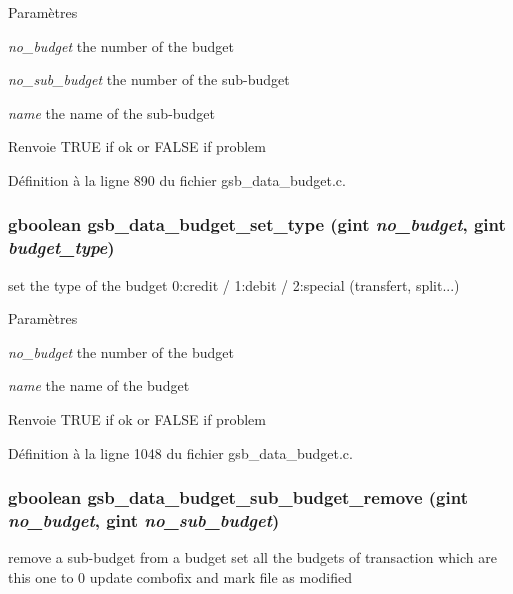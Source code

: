 \begin{DoxyParams}{Paramètres}
\item[{\em no\_\-budget}]the number of the budget \item[{\em no\_\-sub\_\-budget}]the number of the sub-\/budget \item[{\em name}]the name of the sub-\/budget\end{DoxyParams}
\begin{DoxyReturn}{Renvoie}
TRUE if ok or FALSE if problem 
\end{DoxyReturn}


Définition à la ligne 890 du fichier gsb\_\-data\_\-budget.c.

\subsubsection[{gsb\_\-data\_\-budget\_\-set\_\-type}]{\setlength{\rightskip}{0pt plus 5cm}gboolean gsb\_\-data\_\-budget\_\-set\_\-type (gint {\em no\_\-budget}, \/  gint {\em budget\_\-type})}\label{gsb__data__budget_8c_a18a43763864f599ceed2d20b79616042}
set the type of the budget 0:credit / 1:debit / 2:special (transfert, split...)


\begin{DoxyParams}{Paramètres}
\item[{\em no\_\-budget}]the number of the budget \item[{\em name}]the name of the budget\end{DoxyParams}
\begin{DoxyReturn}{Renvoie}
TRUE if ok or FALSE if problem 
\end{DoxyReturn}


Définition à la ligne 1048 du fichier gsb\_\-data\_\-budget.c.

\subsubsection[{gsb\_\-data\_\-budget\_\-sub\_\-budget\_\-remove}]{\setlength{\rightskip}{0pt plus 5cm}gboolean gsb\_\-data\_\-budget\_\-sub\_\-budget\_\-remove (gint {\em no\_\-budget}, \/  gint {\em no\_\-sub\_\-budget})}\label{gsb__data__budget_8c_ad30a7dbc9af5632fac4fd916de04db66}
remove a sub-\/budget from a budget set all the budgets of transaction which are this one to 0 update combofix and mark file as modified


